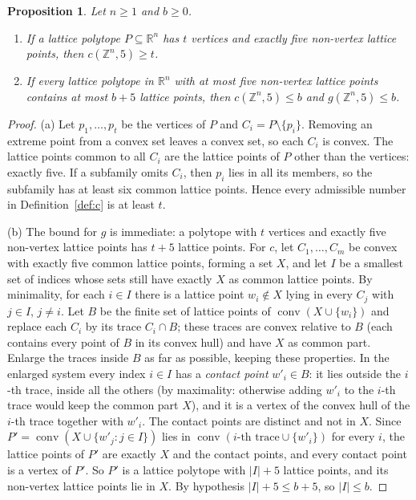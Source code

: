 \documentclass[11pt]{article}
\newtheorem{proposition}{Proposition}
\theoremstyle{definition}
\theoremstyle{remark}
\newcommand{\Z}{\mathbb Z}
\newcommand{\R}{\mathbb R}
\newcommand{\conv}{\operatorname{conv}}
\begin{document}
\begin{proposition}\label{prop:transfer}
Let $n\ge1$ and $b\ge0$.
\begin{enumerate}
\item[(a)] If a lattice polytope $P\subseteq\R^n$ has $t$ vertices and exactly
five non-vertex lattice points, then $c(\Z^n,5)\ge t$.
\item[(b)] If every lattice polytope in $\R^n$ with at most five non-vertex
lattice points contains at most $b+5$ lattice points, then $c(\Z^n,5)\le b$
and $g(\Z^n,5)\le b$.
\end{enumerate}
\end{proposition}

\begin{proof}
(a) Let $p_1,\dots,p_t$ be the vertices of $P$ and $C_i=P\setminus\{p_i\}$.
Removing an extreme point from a convex set leaves a convex set, so each $C_i$
is convex. The lattice points common to all $C_i$ are the lattice points of $P$
other than the vertices: exactly five. If a subfamily omits $C_i$, then $p_i$
lies in all its members, so the subfamily has at least six common lattice
points. Hence every admissible number in Definition~\ref{def:c} is at least
$t$.

(b) The bound for $g$ is immediate: a polytope with $t$ vertices and exactly
five non-vertex lattice points has $t+5$ lattice points. For $c$, let
$C_1,\dots,C_m$ be convex with exactly five common lattice points, forming a
set $X$, and let $I$ be a smallest set of indices whose sets still have exactly
$X$ as common lattice points. By minimality, for each $i\in I$ there is a
lattice point $w_i\notin X$ lying in every $C_j$ with $j\in I$, $j\ne i$. Let
$B$ be the finite set of lattice points of $\conv(X\cup\{w_i\})$ and replace
each $C_i$ by its trace $C_i\cap B$; these traces are convex relative to $B$
(each contains every point of $B$ in its convex hull) and have $X$ as common
part. Enlarge the traces inside $B$ as far as possible, keeping these
properties. In the enlarged system every index $i\in I$ has a \emph{contact
point} $w'_i\in B$: it lies outside the $i$-th trace, inside all the others
(by maximality: otherwise adding $w'_i$ to the $i$-th trace would keep the
common part $X$), and it is a vertex of the convex hull of the $i$-th trace
together with $w'_i$. The contact points are distinct and not in $X$. Since
$P'=\conv(X\cup\{w'_j:j\in I\})$ lies in $\conv(\text{$i$-th trace}\cup\{w'_i\})$
for every $i$, the lattice points of $P'$ are exactly $X$ and the contact
points, and every contact point is a vertex of $P'$. So $P'$ is a lattice polytope with
$|I|+5$ lattice points, and its non-vertex lattice points lie in $X$. By
hypothesis $|I|+5\le b+5$, so $|I|\le b$.
\end{proof}
\end{document}
